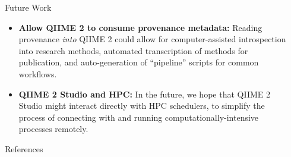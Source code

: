 \documentclass[final]{beamer}
\newlength{\sepwidth}
\newlength{\colwidth}
\newcommand{\separatorcolumn}{\begin{column}{\sepwidth}\end{column}}
\begin{document}
\begin{frame}[t]
\begin{columns}[t]
\begin{column}{\colwidth}
\begin{block}{Future Work}
    \begin{itemize}
      \item \textbf{Allow QIIME 2 to consume provenance metadata:} Reading
      provenance \textit{into} QIIME 2 could allow for computer-assisted
      introspection into research methods, automated transcription of methods
      for publication, and auto-generation of “pipeline” scripts for common workflows.
      \item \textbf{QIIME 2 Studio and HPC:} In the future, we hope that QIIME 2 Studio might interact
      directly with HPC schedulers, to simplify the process of connecting with
      and running computationally-intensive processes remotely.
    \end{itemize}

  \end{block}

  \begin{block}{References}

    \nocite{*}
    

  \end{block}

\end{column}

\separatorcolumn
\end{columns}
\end{frame}
\end{document}

